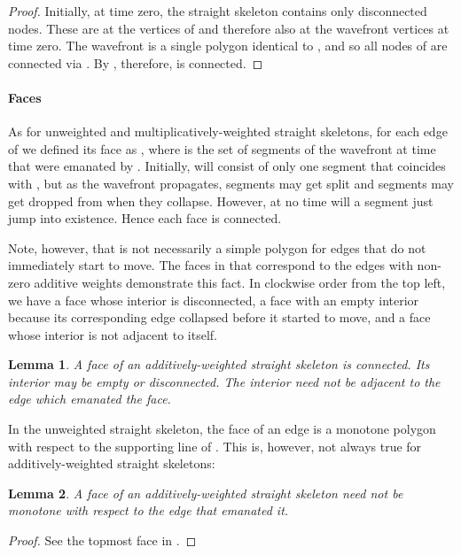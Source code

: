 \documentclass[preprint]{elsarticle}
\newtheorem{lemma}{Lemma}
\begin{document}
\begin{proof}
  Initially, at time zero, the straight skeleton contains only
  disconnected nodes.  These are at the vertices of  and
  therefore also at the wavefront vertices at time zero.
The wavefront  is a single polygon identical
  to , and so all nodes of  are connected via
  .
By , therefore,  is connected.
\end{proof}



\paragraph{Faces}

As for unweighted and multiplicatively-weighted straight skeletons, for each
edge  of  we defined its face as , where
 is the set of segments of the wavefront at time  that were emanated
by .  Initially,  will consist of only one segment that coincides
with , but as the wavefront propagates, segments may get split and segments
may get dropped from  when they collapse.  However, at no time will a
segment just jump into existence.  Hence each face is connected.

Note, however, that  is not necessarily a simple polygon for edges
that do not immediately start to move.  The faces in  that
correspond to the edges with non-zero additive weights  demonstrate
this fact.  In clockwise order from the top left, we have a face whose
interior is disconnected, a face with an empty interior because its
corresponding edge collapsed before it started to move, and a face whose
interior is not adjacent to  itself.

\begin{lemma}
  A face of an additively-weighted straight skeleton is connected.  Its
  interior may be empty or disconnected.  The interior need not be adjacent to
  the edge which emanated the face.
\end{lemma}

In the unweighted straight skeleton, the face of an edge  is a
monotone polygon with respect to the supporting line of .
This is, however, not always true for additively-weighted straight
skeletons:

\begin{lemma}
  A face of an additively-weighted straight skeleton need not be
  monotone with respect to the edge that emanated it.
\end{lemma}
\begin{proof}
  See the topmost face in .
\end{proof}
\end{document}
